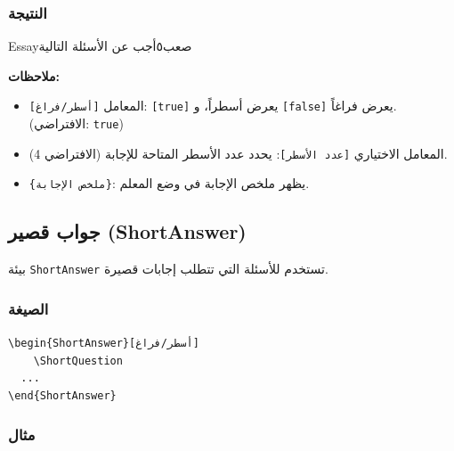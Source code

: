 \documentclass[a4paper]{article}
\begin{document}
\subsubsection*{النتيجة}

\begin{Question}{Essay}{صعب}{٥}{أجب عن الأسئلة التالية}
\begin{Essay}[true]
\end{Essay}
\end{Question}

\textbf{ملاحظات:}
\begin{itemize}
    \item المعامل \texttt{[أسطر/فراغ]}: \texttt{[true]} يعرض أسطراً، و \texttt{[false]} يعرض فراغاً. (الافتراضي: \texttt{true})
    \item المعامل الاختياري \texttt{[عدد الأسطر]}: يحدد عدد الأسطر المتاحة للإجابة (الافتراضي 4).    
    \item \texttt{\{ملخص الإجابة\}}: يظهر ملخص الإجابة في وضع المعلم.
\end{itemize}

\subsection{جواب قصير (ShortAnswer)}

بيئة \texttt{ShortAnswer} تستخدم للأسئلة التي تتطلب إجابات قصيرة.

\subsubsection*{الصيغة}

\begin{LTR}\ttfamily
\verb|\begin{ShortAnswer}[أسطر/فراغ]|\\
\verb|    \ShortQuestion|\\
\verb|  ...|\\
\verb|\end{ShortAnswer}|
\end{LTR}

\subsubsection*{مثال}
\end{document}
